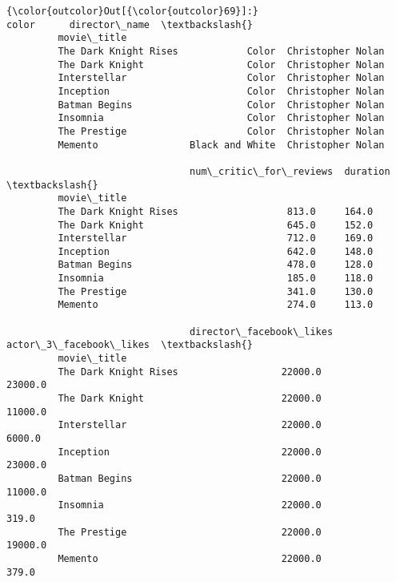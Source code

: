 \documentclass[11pt]{article}
\begin{document}
\begin{Verbatim}[commandchars=\\\{\}]
{\color{outcolor}Out[{\color{outcolor}69}]:}                                  color      director\_name  \textbackslash{}
         movie\_title                                                 
         The Dark Knight Rises            Color  Christopher Nolan   
         The Dark Knight                  Color  Christopher Nolan   
         Interstellar                     Color  Christopher Nolan   
         Inception                        Color  Christopher Nolan   
         Batman Begins                    Color  Christopher Nolan   
         Insomnia                         Color  Christopher Nolan   
         The Prestige                     Color  Christopher Nolan   
         Memento                Black and White  Christopher Nolan   
         
                                num\_critic\_for\_reviews  duration  \textbackslash{}
         movie\_title                                               
         The Dark Knight Rises                   813.0     164.0   
         The Dark Knight                         645.0     152.0   
         Interstellar                            712.0     169.0   
         Inception                               642.0     148.0   
         Batman Begins                           478.0     128.0   
         Insomnia                                185.0     118.0   
         The Prestige                            341.0     130.0   
         Memento                                 274.0     113.0   
         
                                director\_facebook\_likes  actor\_3\_facebook\_likes  \textbackslash{}
         movie\_title                                                              
         The Dark Knight Rises                  22000.0                 23000.0   
         The Dark Knight                        22000.0                 11000.0   
         Interstellar                           22000.0                  6000.0   
         Inception                              22000.0                 23000.0   
         Batman Begins                          22000.0                 11000.0   
         Insomnia                               22000.0                   319.0   
         The Prestige                           22000.0                 19000.0   
         Memento                                22000.0                   379.0   
         

\end{Verbatim}
\end{document}
